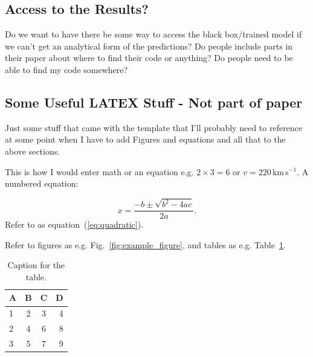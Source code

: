 \documentclass[fleqn,usenatbib]{mnras}
\begin{document}
\subsection{Access to the Results?}
Do we want to have there be some way to access the black box/trained model if we can't get an analytical form of the predictions? Do people include parts in their paper about where to find their code or anything? Do people need to be able to find my code somewhere?

\subsection{Some Useful LATEX Stuff - Not part of paper}
Just some stuff that came with the template that I'll probably need to reference at some point when I have to add Figures and equations and all that to the above sections.

This is how I would enter math or an equation e.g. $2\times3=6$
or $v=220$\,km\,s$^{-1}$. A numbered equation:

\begin{equation}
    x=\frac{-b\pm\sqrt{b^2-4ac}}{2a}.
	\label{eq:quadratic}
\end{equation}
Refer to as equation~(\ref{eq:quadratic}).

Refer to figures as e.g. Fig.~\ref{fig:example_figure}, and tables as
e.g. Table~\ref{tab:example_table}.

\begin{table}
	\centering
	\caption{Caption for the table.}
	\label{tab:example_table}
	\begin{tabular}{lccr} %
		\hline
		A & B & C & D\\
		\hline
		1 & 2 & 3 & 4\\
		2 & 4 & 6 & 8\\
		3 & 5 & 7 & 9\\
		\hline
	\end{tabular}
\end{table}
\end{document}
